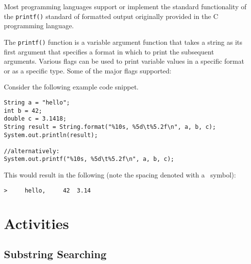 \documentclass[12pt]{scrartcl}
\begin{document}
Most programming languages support or implement the standard 
functionality of the \texttt{printf()} standard of formatted 
output originally provided in the C programming language.

The \texttt{printf()} function is a variable argument 
function that takes a string as its first argument that specifies 
a format in which to print the subsequent arguments.  Various flags 
can be used to print variable values in a specific format or as a 
specific type.  Some of the major flags supported:
	
Consider the following example code snippet.

\begin{verbatim}
String a = "hello"; 
int b = 42;
double c = 3.1418;
String result = String.format("%10s, %5d\t%5.2f\n", a, b, c);
System.out.println(result);

//alternatively:
System.out.printf("%10s, %5d\t%5.2f\n", a, b, c);
\end{verbatim}

This would result in the following (note the spacing denoted
with a \textvisiblespace\ symbol):

\begin{verbatim}
>     hello,     42	 3.14
\end{verbatim}     

\section*{Activities}

\subsection*{Substring Searching}
\end{document}
